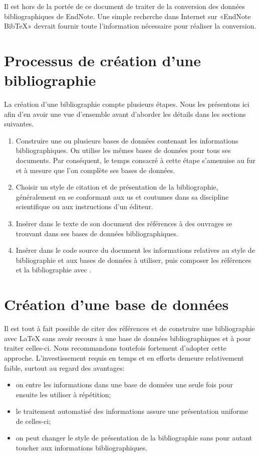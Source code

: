 Il est hors de la portée de ce document de traiter de la conversion
des données bibliographiques de EndNote. Une simple recherche dans
Internet sur «EndNote BibTeX» devrait fournir toute l'information
nécessaire pour réaliser la conversion.


\section{Processus de création d'une bibliographie}
\label{sec:bibliographie:processus}

La création d'une bibliographie compte plusieurs étapes. Nous les
présentons ici afin d'en avoir une vue d'ensemble avant d'aborder les
détails dans les sections suivantes.

\begin{enumerate}
\item Construire une ou plusieurs bases de données contenant les
  informations bibliographiques. On utilise les mêmes bases de données
  pour tous ses documents. Par conséquent, le temps consacré à cette
  étape s'amenuise au fur et à mesure que l'on complète ses bases de
  données.
\item Choisir un style de citation et de présentation de la
  bibliographie, généralement en se conformant aux us et coutumes dans
  sa discipline scientifique ou aux instructions d'un éditeur.
\item Insérer dans le texte de son document des références à des
  ouvrages se trouvant dans ses bases de données bibliographiques.
\item Insérer dans le code source du document les informations
  relatives au style de bibliographie et aux bases de données à
  utiliser, puis composer les références et la bibliographie avec
  {\BibTeX}.
\end{enumerate}


\section{Création d'une base de données}
\label{sec:bibliographie:bib}

Il est tout à fait possible de citer des références et de construire
une bibliographie avec {\LaTeX} sans avoir recours à une base de
données bibliographiques et à {\BibTeX} pour traiter celles-ci. Nous
recommandons toutefois fortement d'adopter cette approche.
L'investissement requis en temps et en efforts demeure relativement
faible, surtout au regard des avantages:
\begin{itemize}
\item on entre les informations dans une base de données une seule
  fois pour ensuite les utiliser à répétition;
\item le traitement automatisé des informations assure une
  présentation uniforme de celles-ci;
\item on peut changer le style de présentation de la bibliographie
  sans pour autant toucher aux informations bibliographiques.
\end{itemize}

